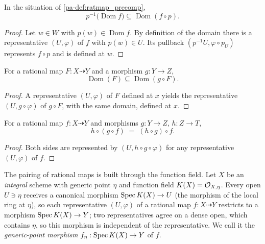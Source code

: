 \begin{lemma}
  \label{pa-lem:ratmap_le_domain_precomp}
  \leanok

  In the situation of \ref{pa-def:ratmap_precomp},
  \[
    p^{-1}\bigl(\operatorname{Dom} f\bigr) \subseteq \operatorname{Dom}(f \circ p).
  \]
\end{lemma}
\begin{proof}
  \leanok
  Let \(w \in W\) with \(p(w) \in \operatorname{Dom} f\). By definition of the
  domain there is a representative \((U, \varphi)\) of \(f\) with \(p(w) \in U\).
  Its pullback \((p^{-1}U, \varphi \circ p_U)\) represents \(f \circ p\) and is
  defined at \(w\).
\end{proof}

\begin{lemma}
  \label{pa-lem:ratmap_le_domain_compHom}
  \leanok

  For a rational map \(F : X \dashrightarrow Y\) and a morphism \(g : Y \to Z\),
  \[
    \operatorname{Dom}(F) \subseteq \operatorname{Dom}(g \circ F).
  \]
\end{lemma}
\begin{proof}
  \leanok
  A representative \((U, \varphi)\) of \(F\) defined at \(x\) yields the
  representative \((U, g \circ \varphi)\) of \(g \circ F\), with the same
  domain, defined at \(x\).
\end{proof}

\begin{lemma}
  \label{pa-lem:ratmap_compHom_compHom}
  \leanok

  For a rational map \(f : X \dashrightarrow Y\) and morphisms \(g : Y \to Z\),
  \(h : Z \to T\),
  \[
    h \circ (g \circ f) \;=\; (h \circ g) \circ f .
  \]
\end{lemma}
\begin{proof}
  \leanok
  Both sides are represented by \((U, h \circ g \circ \varphi)\) for any
  representative \((U, \varphi)\) of \(f\).
\end{proof}

The pairing of rational maps is built through the function field. Let \(X\) be
an \emph{integral} scheme with generic point \(\eta\) and function field
\(K(X) = \mathcal{O}_{X,\eta}\). Every open \(U \ni \eta\) receives a canonical
morphism \(\operatorname{Spec} K(X) \to U\) (the morphism of the local ring at \(\eta\)), so
each representative \((U, \varphi)\) of a rational map
\(f : X \dashrightarrow Y\) restricts to a morphism
\(\operatorname{Spec} K(X) \to Y\); two representatives agree on a dense open, which contains
\(\eta\), so this morphism is independent of the representative. We call it the
\emph{generic-point morphism} \(f_\eta : \operatorname{Spec} K(X) \to Y\) of \(f\).


